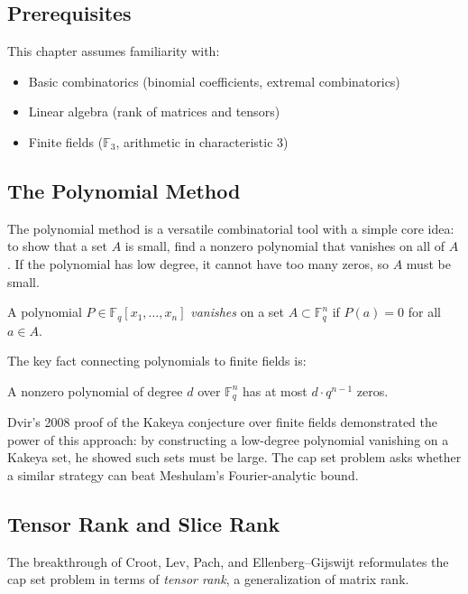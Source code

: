 \subsection{Prerequisites}
This chapter assumes familiarity with:
\begin{itemize}
\item Basic combinatorics (binomial coefficients, extremal combinatorics)
\item Linear algebra (rank of matrices and tensors)
\item Finite fields ($\mathbb{F}_3$, arithmetic in characteristic 3)
\end{itemize}

\subsection{The Polynomial Method}

The polynomial method is a versatile combinatorial tool with a simple core idea: to show that a set $A$ is small, find a nonzero polynomial that vanishes on all of $A$. If the polynomial has low degree, it cannot have too many zeros, so $A$ must be small.

\begin{definition}
A polynomial $P \in \mathbb{F}_q[x_1, \ldots, x_n]$ \emph{vanishes} on a set $A \subset \mathbb{F}_q^n$ if $P(a) = 0$ for all $a \in A$.
\end{definition}

The key fact connecting polynomials to finite fields is:

\begin{fact}
A nonzero polynomial of degree $d$ over $\mathbb{F}_q^n$ has at most $d \cdot q^{n-1}$ zeros.
\end{fact}

Dvir's 2008 proof of the Kakeya conjecture over finite fields demonstrated the power of this approach: by constructing a low-degree polynomial vanishing on a Kakeya set, he showed such sets must be large. The cap set problem asks whether a similar strategy can beat Meshulam's Fourier-analytic bound.

\subsection{Tensor Rank and Slice Rank}

The breakthrough of Croot, Lev, Pach, and Ellenberg--Gijswijt reformulates the cap set problem in terms of \emph{tensor rank}, a generalization of matrix rank.

